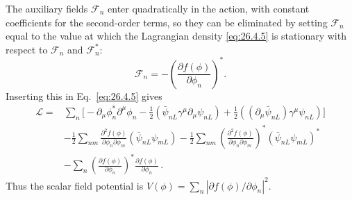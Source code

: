 The auxiliary fields \(\mathcal{F}_n\) enter quadratically in the action, with
constant coefficients for the second-order terms, so they can be eliminated
by setting \(\mathcal{F}_n\) equal to the value at which the Lagrangian density
\eqref{eq:26.4.5} is stationary with respect to \(\mathcal{F}_n\) and
\(\mathcal{F}_n^*\):
\begin{equation}
  \mathcal{F}_n=-\left(\frac{\partial f(\phi)}{\partial\phi_n}\right)^* .
  \tag{26.4.6}\label{eq:26.4.6}
\end{equation}
Inserting this in Eq.~\eqref{eq:26.4.5} gives
\begin{equation}
  \begin{aligned}
  \mathcal{L}={}&
  \sum_n\biggl[
    -\partial_\mu\phi_n^*\partial^\mu\phi_n
    -\frac12(\bar\psi_{nL}\gamma^\mu\partial_\mu\psi_{nL})
    +\frac12((\partial_\mu\bar\psi_{nL})\gamma^\mu\psi_{nL})
  \biggr]
  \\
  &-\frac12\sum_{nm}
    \frac{\partial^2f(\phi)}{\partial\phi_n\partial\phi_m}
    (\bar\psi_{nL}\psi_{mL})
  -\frac12\sum_{nm}
    \left(\frac{\partial^2f(\phi)}
      {\partial\phi_n\partial\phi_m}\right)^*
    (\bar\psi_{nL}\psi_{mL})^*
  \\
  &-\sum_n
    \left(\frac{\partial f(\phi)}{\partial\phi_n}\right)^*
    \frac{\partial f(\phi)}{\partial\phi_n}\,.
  \end{aligned}
  \tag{26.4.7}\label{eq:26.4.7}
\end{equation}
Thus the scalar field potential is
\(V(\phi)=\sum_n|\partial f(\phi)/\partial\phi_n|^2\).

